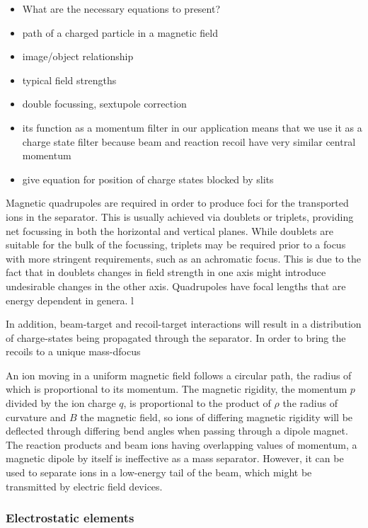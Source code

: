 \small
\begin{itemize}
\item What are the necessary equations to present?
\item path of a charged particle in a magnetic field
\item image/object relationship
\item typical field strengths
\item double focussing, sextupole correction
\item its function as a momentum filter in our application means that we use it as a charge state filter because beam and reaction recoil have very similar central momentum
\item give equation for position of charge states blocked by slits
\end{itemize}
\normalsize

Magnetic quadrupoles are required in order to produce foci for the transported ions in the separator. This is usually achieved via doublets or triplets, providing net focussing in both the horizontal and vertical planes. While doublets are suitable for the bulk of the focussing, triplets may be required prior to a focus with more stringent requirements, such as an achromatic focus. This is due to the fact that in doublets changes in field strength in one axis might introduce undesirable changes in the other axis. Quadrupoles have focal lengths that are energy dependent in genera. l  

In addition, beam-target and recoil-target interactions will result in a distribution of charge-states being propagated through the separator. In order to bring the recoils to a unique mass-dfocus   

An ion moving in a uniform magnetic field follows a circular path, the radius of which is proportional to its  momentum.  The magnetic rigidity, the momentum $p$ divided by the ion charge $q$, is proportional to the product of $\rho$ the radius of curvature and $B$ the magnetic field, so ions of differing magnetic rigidity will be deflected through differing bend angles  when passing through a dipole magnet.  The reaction products and beam ions having overlapping values of momentum, a magnetic dipole by itself is ineffective as a mass separator.  However, it can be used to separate ions in a low-energy tail of the beam, which might be transmitted by electric field devices.

\subsubsection{Electrostatic elements}

